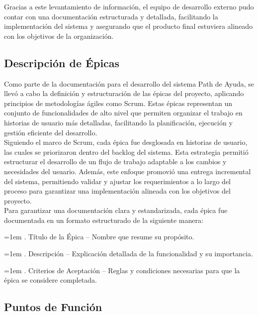 \documentclass[12pt,letterpaper,spanish, xcolor=table]{report}
\numberwithin{figure}{subsection}
\begin{document}
	Gracias a este levantamiento de información, el equipo de desarrollo externo pudo contar con una documentación estructurada y detallada, facilitando la implementación del sistema y asegurando que el producto final estuviera alineado con los objetivos de la organización.

\subsection{Descripción de Épicas}

	Como parte de la documentación para el desarrollo del sistema Path de Ayuda, se llevó a cabo la definición y estructuración de las épicas del proyecto, aplicando principios de metodologías ágiles como Scrum. Estas épicas representan un conjunto de funcionalidades de alto nivel que permiten organizar el trabajo en historias de usuario más detalladas, facilitando la planificación, ejecución y gestión eficiente del desarrollo.\\
	
	Siguiendo el marco de Scrum, cada épica fue desglosada en historias de usuario, las cuales se priorizaron dentro del backlog del sistema. Esta estrategia permitió estructurar el desarrollo de un flujo de trabajo adaptable a los cambios y necesidades del usuario. Además, este enfoque promovió una entrega incremental del sistema, permitiendo validar y ajustar los requerimientos a lo largo del proceso para garantizar una implementación alineada con los objetivos del proyecto.\\
	
	Para garantizar una documentación clara y estandarizada, cada épica fue documentada en un formato estructurado de la siguiente manera:\\
		
	{\leftskip=1em 
		. Título de la Épica – Nombre que resume su propósito.
	\par}
	
	{\leftskip=1em 
		. Descripción – Explicación detallada de la funcionalidad y su importancia.
	\par}
	
	{\leftskip=1em 
		. Criterios de Aceptación – Reglas y condiciones necesarias para que la épica se considere completada.\\
	\par}
	
\subsection{Puntos de Función}
\end{document}
